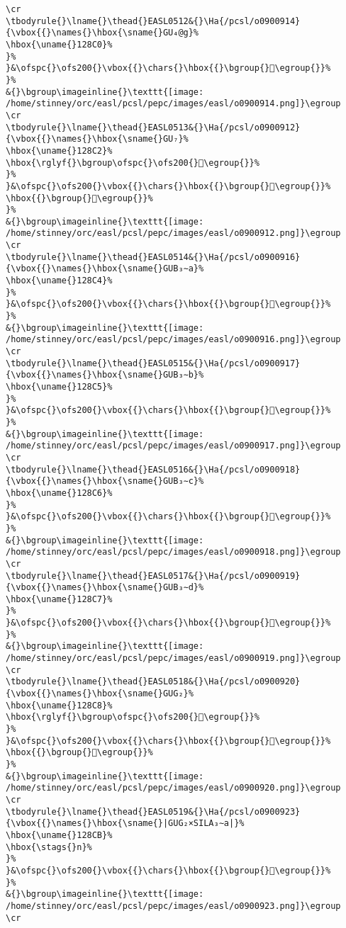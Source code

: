 \begin{verbatim}
\cr
\tbodyrule{}\lname{}\thead{}EASL0512&{}\Ha{/pcsl/o0900914}{\vbox{{}\names{}\hbox{\sname{}GU₄@g}%
\hbox{\uname{}128C0}%
}%
}&\ofspc{}\ofs200{}\vbox{{}\chars{}\hbox{{}\bgroup{}𒣀\egroup{}}%
}%
&{}\bgroup\imageinline{}\texttt{[image: /home/stinney/orc/easl/pcsl/pepc/images/easl/o0900914.png]}\egroup
\cr
\tbodyrule{}\lname{}\thead{}EASL0513&{}\Ha{/pcsl/o0900912}{\vbox{{}\names{}\hbox{\sname{}GU₇}%
\hbox{\uname{}128C2}%
\hbox{\rglyf{}\bgroup\ofspc{}\ofs200{}𒣂\egroup{}}%
}%
}&\ofspc{}\ofs200{}\vbox{{}\chars{}\hbox{{}\bgroup{}𒣂\egroup{}}%
\hbox{{}\bgroup{}𒣃\egroup{}}%
}%
&{}\bgroup\imageinline{}\texttt{[image: /home/stinney/orc/easl/pcsl/pepc/images/easl/o0900912.png]}\egroup
\cr
\tbodyrule{}\lname{}\thead{}EASL0514&{}\Ha{/pcsl/o0900916}{\vbox{{}\names{}\hbox{\sname{}GUB₃∼a}%
\hbox{\uname{}128C4}%
}%
}&\ofspc{}\ofs200{}\vbox{{}\chars{}\hbox{{}\bgroup{}𒣄\egroup{}}%
}%
&{}\bgroup\imageinline{}\texttt{[image: /home/stinney/orc/easl/pcsl/pepc/images/easl/o0900916.png]}\egroup
\cr
\tbodyrule{}\lname{}\thead{}EASL0515&{}\Ha{/pcsl/o0900917}{\vbox{{}\names{}\hbox{\sname{}GUB₃∼b}%
\hbox{\uname{}128C5}%
}%
}&\ofspc{}\ofs200{}\vbox{{}\chars{}\hbox{{}\bgroup{}𒣅\egroup{}}%
}%
&{}\bgroup\imageinline{}\texttt{[image: /home/stinney/orc/easl/pcsl/pepc/images/easl/o0900917.png]}\egroup
\cr
\tbodyrule{}\lname{}\thead{}EASL0516&{}\Ha{/pcsl/o0900918}{\vbox{{}\names{}\hbox{\sname{}GUB₃∼c}%
\hbox{\uname{}128C6}%
}%
}&\ofspc{}\ofs200{}\vbox{{}\chars{}\hbox{{}\bgroup{}𒣆\egroup{}}%
}%
&{}\bgroup\imageinline{}\texttt{[image: /home/stinney/orc/easl/pcsl/pepc/images/easl/o0900918.png]}\egroup
\cr
\tbodyrule{}\lname{}\thead{}EASL0517&{}\Ha{/pcsl/o0900919}{\vbox{{}\names{}\hbox{\sname{}GUB₃∼d}%
\hbox{\uname{}128C7}%
}%
}&\ofspc{}\ofs200{}\vbox{{}\chars{}\hbox{{}\bgroup{}𒣇\egroup{}}%
}%
&{}\bgroup\imageinline{}\texttt{[image: /home/stinney/orc/easl/pcsl/pepc/images/easl/o0900919.png]}\egroup
\cr
\tbodyrule{}\lname{}\thead{}EASL0518&{}\Ha{/pcsl/o0900920}{\vbox{{}\names{}\hbox{\sname{}GUG₂}%
\hbox{\uname{}128C8}%
\hbox{\rglyf{}\bgroup\ofspc{}\ofs200{}𒣈\egroup{}}%
}%
}&\ofspc{}\ofs200{}\vbox{{}\chars{}\hbox{{}\bgroup{}𒣊\egroup{}}%
\hbox{{}\bgroup{}𒣈\egroup{}}%
}%
&{}\bgroup\imageinline{}\texttt{[image: /home/stinney/orc/easl/pcsl/pepc/images/easl/o0900920.png]}\egroup
\cr
\tbodyrule{}\lname{}\thead{}EASL0519&{}\Ha{/pcsl/o0900923}{\vbox{{}\names{}\hbox{\sname{}|GUG₂×SILA₃∼a|}%
\hbox{\uname{}128CB}%
\hbox{\stags{}n}%
}%
}&\ofspc{}\ofs200{}\vbox{{}\chars{}\hbox{{}\bgroup{}𒣋\egroup{}}%
}%
&{}\bgroup\imageinline{}\texttt{[image: /home/stinney/orc/easl/pcsl/pepc/images/easl/o0900923.png]}\egroup
\cr

\end{verbatim}
